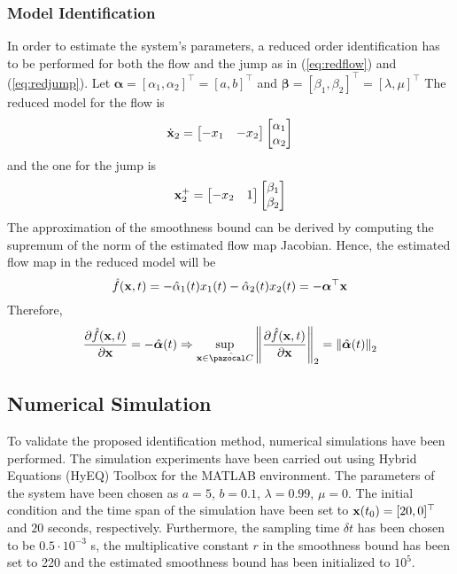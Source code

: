 \subsubsection{Model Identification}
In order to estimate the system's parameters, a reduced order identification has to be performed for both the flow and the jump as in (\ref{eq:redflow}) and (\ref{eq:redjump}). Let $\bm{\alpha} = \left[{\alpha}_1,{\alpha}_2\right]^\top=\left[a,b\right]^\top$ and $\bm{\beta} = \left[{\beta}_1,{\beta}_2\right]^\top = [\lambda,\mu]^\top$
The reduced model for the flow is
%
\begin{equation}
    \dot{\mathbf{x}}_2 = \begin{bmatrix}-x_1&-x_2\end{bmatrix}\begin{bmatrix}{\alpha}_1\\{\alpha}_2\end{bmatrix}
\end{equation}
%
and the one for the jump is
%
\begin{equation}
    \mathbf{x}_2^+ = \begin{bmatrix}-x_2&1\end{bmatrix}\begin{bmatrix}{\beta}_1\\{\beta}_2\end{bmatrix}
\end{equation}
%
The approximation of the  smoothness bound can be derived by computing the supremum of the norm of the estimated flow map Jacobian. Hence, the estimated flow map in the reduced model will be
%
\begin{equation}
    \hat{{f}}(\mathbf{x},t)=-\hat{{\alpha}}_1(t)x_1(t)-\hat{{\alpha}}_2(t)x_2(t) = -\bm{\alpha}^\top\mathbf{x}
\end{equation}
%
Therefore,
\begin{align*}
	\frac{\partial \hat{{f}}(\x,t)}{\partial \x} = -\hat{\bm{\alpha}}(t)
	\Rightarrow\sup\limits_{\x\in\hat{\C}}\left\|\frac{\partial \hat{{f}}(\x,t)}{\partial\x}\right\|_2 = \left\|\hat{\bm{\alpha}}(t)\right\|_2
\end{align*}
%
\subsection{Numerical Simulation}
To validate the proposed identification method, numerical simulations have been performed. The simulation experiments have been carried out using Hybrid Equations (HyEQ) Toolbox \cite{sanfelice2013toolbox} for the MATLAB environment. The parameters of the system have been chosen as $a = 5$, $b = 0.1$, $\lambda=0.99$, $\mu=0$. 
%
The initial condition and the time span of the simulation have been set to $\mathbf{x}(t_0)=[20,0]^\top$ and $20$ seconds, respectively. Furthermore, the sampling time $\delta t$ has been chosen to be $0.5\cdot 10^{-3}$ s, the multiplicative constant $r$ in the smoothness bound has been set to 220 and the estimated smoothness bound has been initialized to $10^5$.

